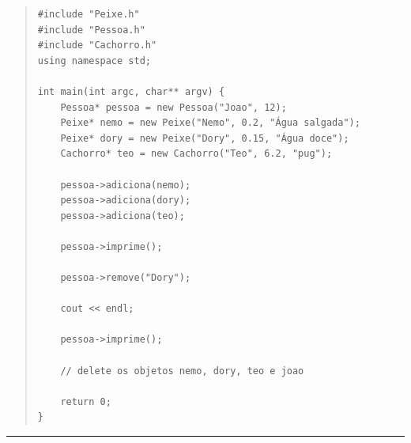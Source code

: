 \documentclass[12pt]{article}
\begin{document}
\begin{quote}
\begin{scriptsize}
\begin{verbatim}
#include "Peixe.h"
#include "Pessoa.h"
#include "Cachorro.h"
using namespace std;

int main(int argc, char** argv) {    
    Pessoa* pessoa = new Pessoa("Joao", 12);    
    Peixe* nemo = new Peixe("Nemo", 0.2, "Água salgada");
    Peixe* dory = new Peixe("Dory", 0.15, "Água doce");
    Cachorro* teo = new Cachorro("Teo", 6.2, "pug");
    
    pessoa->adiciona(nemo);    
    pessoa->adiciona(dory);        
    pessoa->adiciona(teo);
    
    pessoa->imprime();
    
    pessoa->remove("Dory");
    
    cout << endl;
    
    pessoa->imprime();

    // delete os objetos nemo, dory, teo e joao
    
    return 0;
}
\end{verbatim}
\end{scriptsize}
\end{quote}

\par\noindent\rule{\textwidth}{0.4pt}
\end{document}
